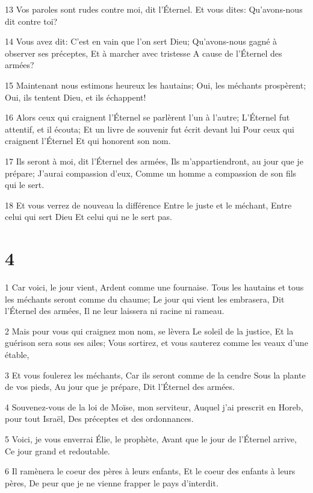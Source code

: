 \par 13 Vos paroles sont rudes contre moi, dit l'Éternel. Et vous dites: Qu'avons-nous dit contre toi?
\par 14 Vous avez dit: C'est en vain que l'on sert Dieu; Qu'avons-nous gagné à observer ses préceptes, Et à marcher avec tristesse A cause de l'Éternel des armées?
\par 15 Maintenant nous estimons heureux les hautains; Oui, les méchants prospèrent; Oui, ils tentent Dieu, et ils échappent!
\par 16 Alors ceux qui craignent l'Éternel se parlèrent l'un à l'autre; L'Éternel fut attentif, et il écouta; Et un livre de souvenir fut écrit devant lui Pour ceux qui craignent l'Éternel Et qui honorent son nom.
\par 17 Ils seront à moi, dit l'Éternel des armées, Ils m'appartiendront, au jour que je prépare; J'aurai compassion d'eux, Comme un homme a compassion de son fils qui le sert.
\par 18 Et vous verrez de nouveau la différence Entre le juste et le méchant, Entre celui qui sert Dieu Et celui qui ne le sert pas.

\chapter{4}

\par 1 Car voici, le jour vient, Ardent comme une fournaise. Tous les hautains et tous les méchants seront comme du chaume; Le jour qui vient les embrasera, Dit l'Éternel des armées, Il ne leur laissera ni racine ni rameau.
\par 2 Mais pour vous qui craignez mon nom, se lèvera Le soleil de la justice, Et la guérison sera sous ses ailes; Vous sortirez, et vous sauterez comme les veaux d'une étable,
\par 3 Et vous foulerez les méchants, Car ils seront comme de la cendre Sous la plante de vos pieds, Au jour que je prépare, Dit l'Éternel des armées.
\par 4 Souvenez-vous de la loi de Moïse, mon serviteur, Auquel j'ai prescrit en Horeb, pour tout Israël, Des préceptes et des ordonnances.
\par 5 Voici, je vous enverrai Élie, le prophète, Avant que le jour de l'Éternel arrive, Ce jour grand et redoutable.
\par 6 Il ramènera le coeur des pères à leurs enfants, Et le coeur des enfants à leurs pères, De peur que je ne vienne frapper le pays d'interdit.


